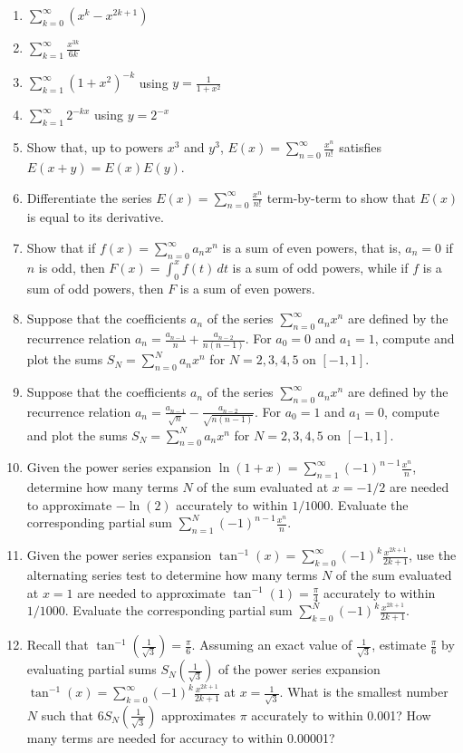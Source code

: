 \documentclass{exercises}
\begin{document}
\begin{enumerate}[resume]
\item $\sum_{k=0}^{\infty}(x^{k}-x^{2k+1})$
\item $\sum_{k=1}^{\infty}\frac{x^{3k}}{6k}$
\item $\sum_{k=1}^{\infty}{(1+x^{2})}^{-k}$ using $y=\frac{1}{1+x^{2}}$
\item $\sum_{k=1}^{\infty}2^{-kx}$ using $y=2^{-x}$
\item Show that, up to powers $x^{3}$ and $y^{3}$, $E(x)=\sum_{n=0}^{\infty}\frac{x^{n}}{n!}$ satisfies $E(x+y)=E(x)E(y)$.
\item Differentiate the series $E(x)=\sum_{n=0}^{\infty}\frac{x^{n}}{n!}$ term-by-term to show that $E(x)$ is equal to its derivative.
\item Show that if $f(x)=\sum_{n=0}^{\infty}a_{n}x^{n}$ is a sum of even powers, that is, $a_{n}=0$ if $n$ is odd, then $F(x)=\int_{0}^{x}f(t)\,dt$ is a sum of odd powers, while if $f$ is a sum of odd powers, then $F$ is a sum of even powers.
\item \techrequired Suppose that the coefficients $a_{n}$ of the series $\sum_{n=0}^{\infty}a_{n}x^{n}$ are defined by the recurrence relation $a_{n}=\frac{a_{n-1}}{n}+\frac{a_{n-2}}{n(n-1)}$. For $a_{0}=0$ and $a_{1}=1$, compute and plot the sums $S_{N}=\sum_{n=0}^{N}a_{n}x^{n}$ for $N=2,3,4,5$ on $[-1,1]$.
\item \techrequired Suppose that the coefficients $a_{n}$ of the series $\sum_{n=0}^{\infty}a_{n}x^{n}$ are defined by the recurrence relation $a_{n}=\frac{a_{n-1}}{\sqrt{n}}-\frac{a_{n-2}}{\sqrt{n(n-1)}}$. For $a_{0}=1$ and $a_{1}=0$, compute and plot the sums $S_{N}=\sum_{n=0}^{N}a_{n}x^{n}$ for $N=2,3,4,5$ on $[-1,1]$.
\item \techrequired Given the power series expansion $\ln (1+x)=\sum_{n=1}^{\infty}{(-1)}^{n-1}\frac{x^{n}}{n}$, determine how many terms $N$ of the sum evaluated at $x=-1/2$ are needed to approximate $-\ln (2)$ accurately to within $1/1000$. Evaluate the corresponding partial sum $\sum_{n=1}^{N}{(-1)}^{n-1}\frac{x^{n}}{n}$.
\item \techrequired Given the power series expansion $\tan^{-1}(x)=\sum_{k=0}^{\infty}{(-1)}^{k}\frac{x^{2k+1}}{2k+1}$, use the alternating series test to determine how many terms $N$ of the sum evaluated at $x=1$ are needed to approximate $\tan^{-1}(1)=\frac{\pi}{4}$ accurately to within $1/1000$. Evaluate the corresponding partial sum $\sum_{k=0}^{N}{(-1)}^{k}\frac{x^{2k+1}}{2k+1}$.
\item \techrequired Recall that $\tan^{-1}(\frac{1}{\sqrt{3}})=\frac{\pi}{6}$. Assuming an exact value of $\frac{1}{\sqrt{3}}$, estimate $\frac{\pi}{6}$ by evaluating partial sums $S_{N}(\frac{1}{\sqrt{3}})$ of the power series expansion $\tan^{-1}(x)=\sum_{k=0}^{\infty}{(-1)}^{k}\frac{x^{2k+1}}{2k+1}$ at $x=\frac{1}{\sqrt{3}}$. What is the smallest number $N$ such that $6S_{N}(\frac{1}{\sqrt{3}})$ approximates $\pi$ accurately to within 0.001? How many terms are needed for accuracy to within 0.00001?
\end{enumerate}
\end{document}
